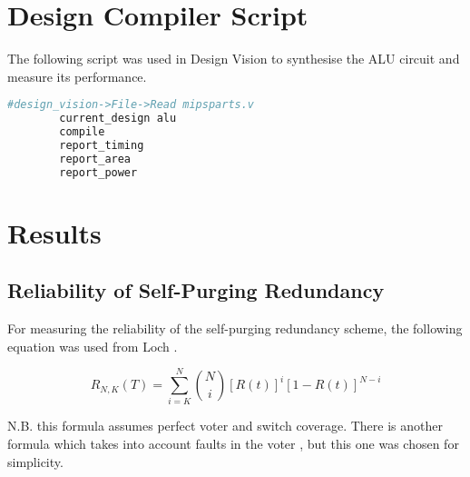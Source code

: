 \documentclass[a4paper,12pt]{article}
\begin{document}
    \section{Design Compiler Script}
    The following script was used in Design Vision to synthesise the ALU circuit and measure its performance.

    \begin{lstlisting}[language=Bash,
        commentstyle=\color{comment}]
        #design_vision->File->Read mipsparts.v
        current_design alu
        compile
        report_timing
        report_area
        report_power
    \end{lstlisting}

    \section{Results}
    \subsection{Reliability of Self-Purging Redundancy}
    For measuring the reliability of the self-purging redundancy scheme, the following equation was used from Loch \cite[~Section 3-A]{1674656}.

    $$R_{N,K}(T) = \sum_{i = K}^{N} {N \choose i}\left[R(t)\right]^i\left[1 - R(t)\right]^{N - i} $$

    N.B. this formula assumes perfect voter and switch coverage. There is another formula which takes into account faults in the voter \cite[~Section 3-B]{1674656}, but this one was chosen for simplicity.

    \printbibliography
\end{document}

